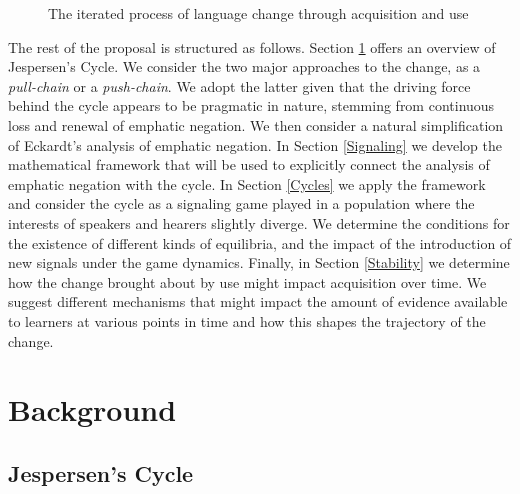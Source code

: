 \documentclass[12pt]{article}
\theoremstyle{definition} \newtheorem{definition}{Definition}
\begin{document}
\begin{figure}
\begin{center}
\end{center}
\caption{The iterated process of language change through acquisition and use}
\label{trans}
\end{figure}

The rest of the proposal is structured as follows. Section \ref{Background} offers an overview of Jespersen's Cycle.  We consider the two major approaches to the change, as a \emph{pull-chain} or a \emph{push-chain}. We adopt the latter given that the driving force behind the cycle appears to be pragmatic in nature, stemming from continuous loss and renewal of emphatic negation. We then consider a natural simplification of Eckardt's \citeyear{eckardt2006} analysis of emphatic negation. In Section \ref{Signaling} we develop the mathematical framework that will be used to explicitly connect the analysis of emphatic negation with the cycle. In Section \ref{Cycles} we apply the framework and consider the cycle as a signaling game played in a population where the interests of speakers and hearers slightly diverge. We determine the conditions for the existence of different kinds of equilibria, and the impact of the introduction of new signals under the game dynamics. Finally, in Section \ref{Stability} we 
determine how the change brought about by use might impact acquisition over time. We suggest different mechanisms that might impact the amount of evidence available to learners at various points in time and how this shapes the trajectory of the change.

\section{Background}
\label{Background}

\subsection{Jespersen's Cycle}
\end{document}
